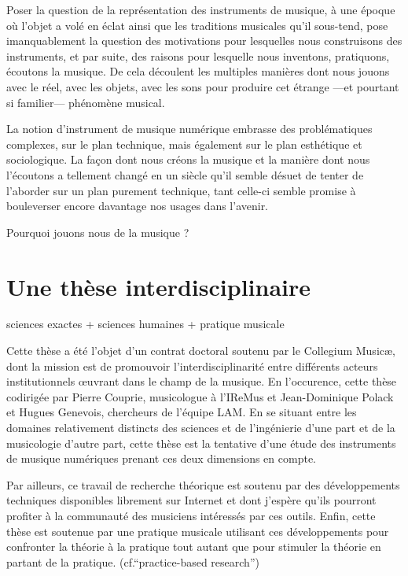 Poser la question de la représentation des instruments de musique, à une époque où l’objet a volé en éclat ainsi que les traditions musicales qu’il sous-tend, pose imanquablement la question des motivations pour lesquelles nous construisons des instruments, et par suite, des raisons pour lesquelle nous inventons, pratiquons, écoutons la musique. De cela découlent les multiples manières dont nous jouons avec le réel, avec les objets, avec les sons pour produire cet étrange —et pourtant si familier— phénomène musical.


La notion d’instrument de musique numérique embrasse des problématiques complexes, sur le plan technique, mais également sur le plan esthétique et sociologique. La façon dont nous créons la musique et la manière dont nous l’écoutons a tellement changé en un siècle qu’il semble désuet de tenter de l’aborder sur un plan purement technique, tant celle-ci semble promise à bouleverser encore davantage nos usages dans l’avenir.

Pourquoi jouons nous de la musique ?


\section{Une thèse interdisciplinaire}

sciences exactes + sciences humaines + pratique musicale

Cette thèse a été l'objet d'un contrat doctoral soutenu par le Collegium Musicæ, dont la mission est de promouvoir l'interdisciplinarité entre différents acteurs institutionnels œuvrant dans le champ de la musique. En l'occurence, cette thèse codirigée par Pierre Couprie, musicologue à l'\gls{IReMus} et Jean-Dominique Polack et Hugues Genevois, chercheurs de l'équipe \gls{LAM}.
En se situant entre les domaines relativement distincts des sciences et de l'ingénierie d'une part et de la musicologie d'autre part, cette thèse est la tentative d'une étude des instruments de musique numériques prenant ces deux dimensions en compte.

Par ailleurs, ce travail de recherche théorique est soutenu par des développements techniques disponibles librement sur Internet et dont j'espère qu'ils pourront profiter à la communauté des musiciens intéressés par ces outils.
Enfin, cette thèse est soutenue par une pratique musicale utilisant ces développements pour confronter la théorie à la pratique tout autant que pour stimuler la théorie en partant de la pratique. (cf.``practice-based research'')

